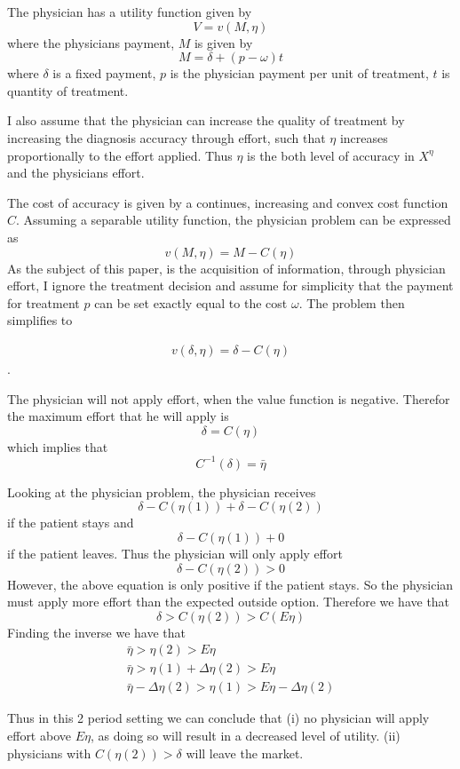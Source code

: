 The physician has a utility function given by
\[
    V=v(M,\eta)
\]
where the physicians payment, $M$ is given by
\[
    M=\delta+(p-\omega)t 
\]
where $\delta$ is a fixed payment, $p$ is the physician payment per unit of treatment, $t$ is quantity of treatment.

 I also assume that the physician can increase the quality of treatment by increasing the diagnosis accuracy through effort, such that $\eta$ increases proportionally to the effort applied. Thus $\eta$ is the both level of accuracy in $X^\eta$ and the physicians effort. 

 The cost of accuracy is given by a continues, increasing and convex cost function $C$. Assuming a separable utility function, the physician problem can be expressed as
\[
    v(M,\eta)=M-C(\eta)
\]
As the subject of this paper, is the acquisition of information, through physician effort, I ignore the treatment decision and assume for simplicity that the payment for treatment $p$ can be set exactly equal to the cost $\omega$.  The problem then simplifies to

\begin{align}
    v(\delta,\eta)=\delta-C(\eta)\label{eq:phys-utility}
\end{align}.

The physician will not apply effort, when the value function is negative. Therefor the maximum effort that he will apply is 
\[
    \delta=C(\eta)
\]
which implies that 
\[
    C^{-1}(\delta)=\bar{\eta}
\]

 Looking at the physician problem, the physician receives 
 \[
     \delta-C(\eta(1))+\delta-C(\eta(2))
 \]
 if the patient stays and 
 \[
     \delta-C(\eta(1))+0
 \]
 if the patient leaves. Thus the physician will only apply effort  
 \[
     \delta-C(\eta(2))>0
 \]
 However, the above equation is only positive if the patient stays. So the physician must apply more effort than the expected outside option. Therefore we have that 
 \[
     \delta>C(\eta(2))>C(E\eta)
 \]
 Finding the inverse we have that 
\begin{align*}
    \bar{\eta}>\eta(2)>E\eta \\
    \bar{\eta}>\eta(1)+\Delta\eta(2)>E\eta \\
    \bar{\eta}-\Delta\eta(2)>\eta(1)>E\eta-\Delta\eta(2) 
\end{align*}
 
 Thus in this 2 period setting we can conclude that (i) no physician will apply effort above $E\eta$, as doing so will result in a decreased level of utility. (ii) physicians with $C(\eta(2))>\delta$ will leave the market. 

